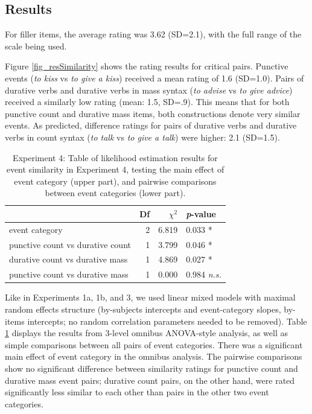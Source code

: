 \documentclass[preprint,12pt,authoryear]{elsarticle}
\begin{document}
\subsection{Results}\label{sec_resES}
For filler items, the average rating was 3.62 (SD=2.1), with the full range of the scale being used. 

Figure \ref{fig_resSimilarity} shows the rating results for critical pairs. Punctive events (\emph{to kiss} vs \emph{to give a kiss}) received a mean rating of 1.6 (SD=1.0). Pairs of durative verbs and durative verbs in mass syntax (\emph{to advise} vs \emph{to give advice}) received a similarly low rating (mean: 1.5, SD=.9). This means that for both punctive count and durative mass items, both constructions denote very similar events.  As predicted, difference ratings for pairs of durative verbs and durative verbs in count syntax (\emph{to talk} vs \emph{to give a talk}) were higher: 2.1 (SD=1.5).

\begin{table}[ht]
\centering
\begin{tabular}{lrrl}
  \hline
 & Df &  $\chi^2$ & \emph{p}-value \\ 
  \hline
  event category          & 2 &  6.819 &  0.033 * \\    \hline
   punctive count vs durative count    & 1 & 3.799 & 0.046 *   \\    
   durative count vs durative mass    & 1  &  4.869 & 0.027 * \\ 
   punctive count vs durative mass   & 1 &  0.000 &  0.984 \emph{n.s.}\\ \hline
\end{tabular}
\caption{Experiment 4: Table of likelihood estimation results for event similarity in Experiment 4, testing the main effect of event category (upper part), and pairwise comparisons between event categories (lower part).}
\label{tab_SimilarityModels}
\end{table}

Like in Experiments 1a, 1b, and 3, we used linear mixed models with maximal random effects structure (by-subjects intercepts and event-category slopes, by-items intercepts; no random correlation parameters needed to be removed). Table \ref{tab_SimilarityModels} displays the results from 3-level omnibus ANOVA-style analysis, as well as simple comparisons between all pairs of event categories. There was a significant main effect of event category in the omnibus analysis.  The pairwise comparisons show no significant difference between similarity ratings for punctive count and durative mass event pairs; durative count pairs, on the other hand, were rated significantly less similar to each other than pairs in the other two event categories.
\end{document}
